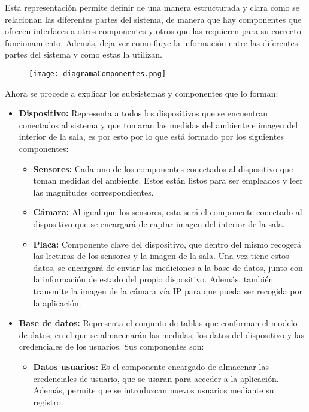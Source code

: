 Esta representación permite definir de una manera estructurada y clara como se relacionan las diferentes partes del sistema, de manera que hay componentes que ofrecen interfaces a otros componentes y otros que las requieren para su correcto funcionamiento. Además, deja ver como fluye la información entre las diferentes partes del sistema y como estas la utilizan.
\begin{figure}[H]
	{\texttt{[image: diagramaComponentes.png]}}
\end{figure}
Ahora se procede a explicar los subsistemas y componentes que lo forman:
\begin{itemize}
	\item \textbf{Dispositivo:} Representa a todos los dispositivos que se encuentran conectados al sistema y que tomaran las medidas del ambiente e imagen del interior de la sala, es por esto por lo que está formado por los siguientes componentes:
	      \begin{itemize}
		      \item \textbf{Sensores:} Cada uno de los componentes conectados al dispositivo que toman medidas del ambiente. Estos están listos para ser empleados y leer las magnitudes correspondientes.
		      \item \textbf{Cámara:} Al igual que los sensores, esta será el componente conectado al dispositivo que se encargará de captar imagen del interior de la sala.
		      \item \textbf{Placa:} Componente clave del dispositivo, que dentro del mismo recogerá las lecturas de los sensores y la imagen de la sala. Una vez tiene estos datos, se encargará de enviar las mediciones a la base de datos, junto con la información de estado del propio dispositivo. Además, también transmite la imagen de la cámara vía IP para que pueda ser recogida por la aplicación.
	      \end{itemize}
	\item \textbf{Base de datos:} Representa el conjunto de tablas que conforman el modelo de datos, en el que se almacenarán las medidas, los datos del dispositivo y las credenciales de los usuarios. Sus componentes son:
	      \begin{itemize}
		      \item \textbf{Datos usuarios:} Es el componente encargado de almacenar las credenciales de usuario, que se usaran para acceder a la aplicación. Además, permite que se introduzcan nuevos usuarios mediante su registro.

\end{itemize}
\end{itemize}
